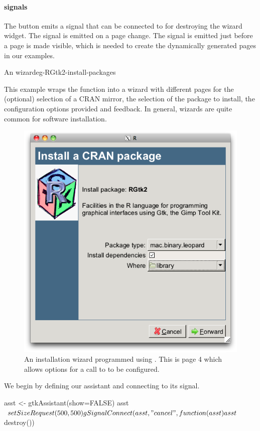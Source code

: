\paragraph{signals}
The  button emits a  signal that can be
connected to for destroying the wizard widget. The 
signal is emitted on a page change. The  signal is
emitted just before a page is made visible, which is needed to create
the dynamically generated pages in our examples.

\begin{example}{An  wizard}{eg-RGtk2-install-packages}

This example wraps the  function into a
wizard with different pages for the (optional) selection of a CRAN
mirror, the selection of the package to install, the configuration
options provided and feedback. In general, wizards are quite common
for software installation.

\begin{figure}
  \centering
  \includegraphics[width=.6\textwidth]{fig-RGtk2-install-wizard.png}
  \caption{An installation wizard programmed using
    . This is page 4 which allows options for a
    call to  to be configured.}
  \label{fig:RGtk2-install-wizard}
\end{figure}


We begin by defining our assistant and connecting to its
 signal.
\begin{Schunk}
\begin{Sinput}
 asst <- gtkAssistant(show=FALSE)
 asst$setSizeRequest(500, 500)
 gSignalConnect(asst, "cancel", function(asst) asst$destroy())
\end{Sinput}
\end{Schunk}


\end{example}
